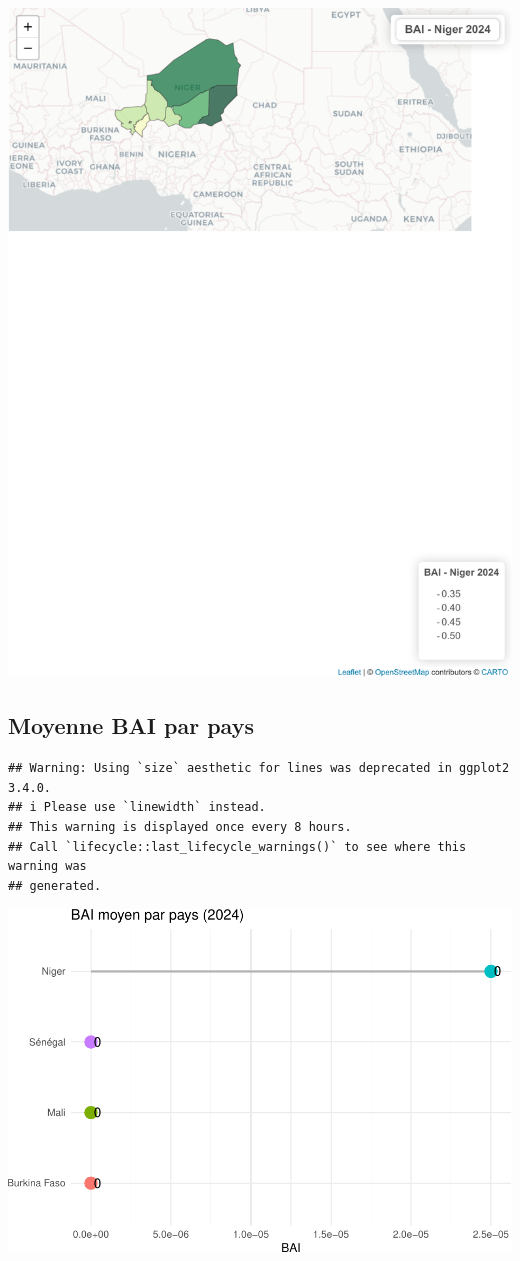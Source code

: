 \documentclass[
]{book}
\begin{document}
\includegraphics{Atlas-Spectral-Sahel_files/figure-latex/bai-cartes-4.pdf}

\subsection{Moyenne BAI par pays}\label{moyenne-bai-par-pays}

\begin{verbatim}
## Warning: Using `size` aesthetic for lines was deprecated in ggplot2 3.4.0.
## i Please use `linewidth` instead.
## This warning is displayed once every 8 hours.
## Call `lifecycle::last_lifecycle_warnings()` to see where this warning was
## generated.
\end{verbatim}

\includegraphics{Atlas-Spectral-Sahel_files/figure-latex/bai-plot-1.pdf}
\end{document}
